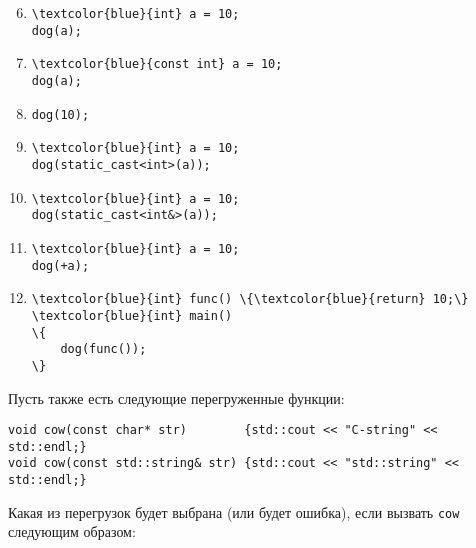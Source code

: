 \documentclass{article}
\begin{document}
\begin{enumerate}
\setcounter{enumi}{5}
\item \begin{Verbatim}[commandchars=\\\{\}]
\textcolor{blue}{int} a = 10;
dog(a);
\end{Verbatim}

\item \begin{Verbatim}[commandchars=\\\{\}]
\textcolor{blue}{const int} a = 10;
dog(a);
\end{Verbatim}

\item \begin{Verbatim}[commandchars=\\\{\}]
dog(10);
\end{Verbatim}

\item \begin{Verbatim}[commandchars=\\\{\}]
\textcolor{blue}{int} a = 10;
dog(static_cast<int>(a));
\end{Verbatim}

\item \begin{Verbatim}[commandchars=\\\{\}]
\textcolor{blue}{int} a = 10;
dog(static_cast<int&>(a));
\end{Verbatim}

\item \begin{Verbatim}[commandchars=\\\{\}]
\textcolor{blue}{int} a = 10;
dog(+a);
\end{Verbatim}

\item \begin{Verbatim}[commandchars=\\\{\}]
\textcolor{blue}{int} func() \{\textcolor{blue}{return} 10;\}
\textcolor{blue}{int} main()
\{
    dog(func());
\}
\end{Verbatim}
\end{enumerate}
Пусть также есть следующие перегруженные функции:
\begin{lstlisting}
void cow(const char* str)        {std::cout << "C-string" << std::endl;}
void cow(const std::string& str) {std::cout << "std::string" << std::endl;}
\end{lstlisting}
Какая из перегрузок будет выбрана (или будет ошибка), если вызвать \texttt{cow} следующим образом:
\end{document}
